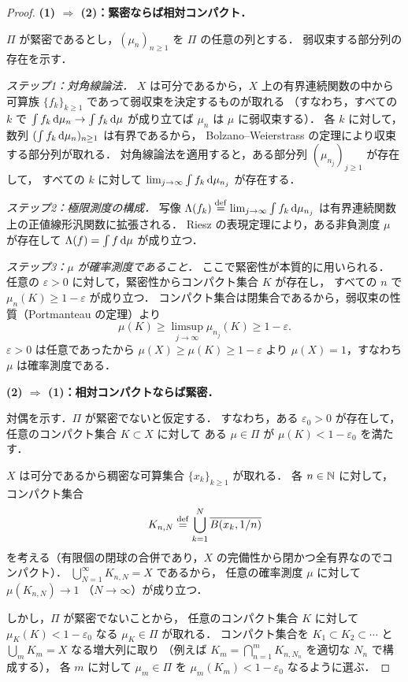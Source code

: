 \begin{proof}
  \textbf{(1) $\Rightarrow$ (2)：緊密ならば相対コンパクト．}

  $\Pi$ が緊密であるとし，$(\mu_n)_{n \geq 1}$ を $\Pi$ の任意の列とする．
  弱収束する部分列の存在を示す．

  \textit{ステップ1：対角線論法．}
  $X$ は可分であるから，$X$ 上の有界連続関数の中から
  可算族 $\{f_k\}_{k \geq 1}$ であって弱収束を決定するものが取れる
  （すなわち，すべての $k$ で $\int f_k \, \mathrm{d}\mu_n \to \int f_k \, \mathrm{d}\mu$
  が成り立てば $\mu_n$ は $\mu$ に弱収束する）．
  各 $k$ に対して，数列 $(\int f_k \, \mathrm{d}\mu_n)_{n \geq 1}$ は有界であるから，
  Bolzano--Weierstrass の定理により収束する部分列が取れる．
  対角線論法を適用すると，ある部分列 $(\mu_{n_j})_{j \geq 1}$ が存在して，
  すべての $k$ に対して $\lim_{j \to \infty} \int f_k \, \mathrm{d}\mu_{n_j}$ が存在する．

  \textit{ステップ2：極限測度の構成．}
  写像 $\Lambda(f_k) \overset{\mathrm{def}}{=} \lim_{j \to \infty} \int f_k \, \mathrm{d}\mu_{n_j}$
  は有界連続関数上の正値線形汎関数に拡張される．
  Riesz の表現定理により，ある非負測度 $\mu$ が存在して
  $\Lambda(f) = \int f \, \mathrm{d}\mu$ が成り立つ．

  \textit{ステップ3：$\mu$ が確率測度であること．}
  ここで緊密性が本質的に用いられる．
  任意の $\varepsilon > 0$ に対して，緊密性からコンパクト集合 $K$ が存在し，
  すべての $n$ で $\mu_n(K) \geq 1 - \varepsilon$ が成り立つ．
  コンパクト集合は閉集合であるから，弱収束の性質（Portmanteau の定理）より
  \[
    \mu(K) \geq \limsup_{j \to \infty} \mu_{n_j}(K) \geq 1 - \varepsilon.
  \]
  $\varepsilon > 0$ は任意であったから $\mu(X) \geq \mu(K) \geq 1 - \varepsilon$ より
  $\mu(X) = 1$，すなわち $\mu$ は確率測度である．

  \medskip
  \textbf{(2) $\Rightarrow$ (1)：相対コンパクトならば緊密．}

  対偶を示す．$\Pi$ が緊密でないと仮定する．
  すなわち，ある $\varepsilon_0 > 0$ が存在して，
  任意のコンパクト集合 $K \subset X$ に対して
  ある $\mu \in \Pi$ が $\mu(K) < 1 - \varepsilon_0$ を満たす．

  $X$ は可分であるから稠密な可算集合 $\{x_k\}_{k \geq 1}$ が取れる．
  各 $n \in \mathbb{N}$ に対して，コンパクト集合
  \[
    K_{n,N} \overset{\mathrm{def}}{=} \bigcup_{k=1}^N \overline{B(x_k, 1/n)}
  \]
  を考える（有限個の閉球の合併であり，$X$ の完備性から閉かつ全有界なのでコンパクト）．
  $\bigcup_{N=1}^{\infty} K_{n,N} = X$ であるから，
  任意の確率測度 $\mu$ に対して $\mu(K_{n,N}) \to 1$ （$N \to \infty$）が成り立つ．

  しかし，$\Pi$ が緊密でないことから，
  任意のコンパクト集合 $K$ に対して $\mu_K(K) < 1 - \varepsilon_0$ なる
  $\mu_K \in \Pi$ が取れる．
  コンパクト集合を $K_1 \subset K_2 \subset \cdots$ と
  $\bigcup_m K_m = X$ なる増大列に取り
  （例えば $K_m = \bigcap_{n=1}^m K_{n, N_n}$ を適切な $N_n$ で構成する），
  各 $m$ に対して $\mu_m \in \Pi$ を $\mu_m(K_m) < 1 - \varepsilon_0$ なるように選ぶ．


\end{proof}
